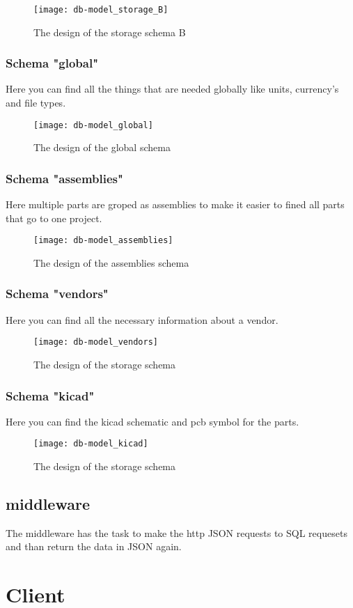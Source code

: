 \begin{figure}
\texttt{[image: db-model\_storage\_B]}
\centering
\caption{The design of the storage schema B}
\end{figure}

\newpage
\subsubsection{Schema "global"}
Here you can find all the things that are needed globally like units, currency's and file types.

\begin{figure}[h]
	\texttt{[image: db-model\_global]}
	\centering
	\caption{The design of the global schema}
\end{figure}

\newpage
\subsubsection{Schema "assemblies"}
Here multiple parts are groped as assemblies to make it easier to fined all parts that go to one project.

\begin{figure}[h]
	\texttt{[image: db-model\_assemblies]}
	\centering
	\caption{The design of the assemblies schema}
\end{figure}

\newpage
\subsubsection{Schema "vendors"}
Here you can find all the necessary information about a vendor.

\begin{figure}[h]
	\texttt{[image: db-model\_vendors]}
	\centering
	\caption{The design of the storage schema}
\end{figure}

\newpage
\subsubsection{Schema "kicad"}
Here you can find the kicad schematic and pcb symbol for the parts.

\begin{figure}[h]
	\texttt{[image: db-model\_kicad]}
	\centering
	\caption{The design of the storage schema}
\end{figure}

\newpage
\subsection{middleware}
The middleware has the task to make the http JSON requests to SQL requesets and than return the data in JSON again.

\newpage
\section{Client}